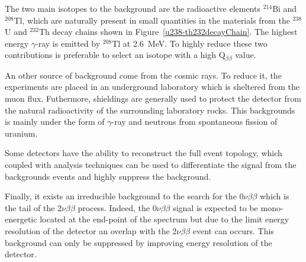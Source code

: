 \documentclass[main.tex]{subfiles}
\begin{document}
\bigskip


\NI The two main isotopes to the background are the radioactive elements $^{\text{214}}$Bi and $^{\text{208}}$Tl, which are naturally present in small quantities in the materials from the $^{\text{238}}$U and $^{\text{232}}$Th decay chains shown in Figure~\ref{u238-th232decayChain}. The highest energy $\gamma$-ray is emitted by $^{\text{208}}$Tl at 2.6~MeV. To highly reduce these two contributions is preferable to select an isotope with a high Q$_{\beta\beta}$ value.


\bigskip

\NI An other source of background come from the cosmic rays. To reduce it, the experiments are placed in an underground laboratory which is sheltered from the muon flux. Futhermore, shieldings are generally used to protect the detector from the natural radioactivity of the surrounding laboratory rocks. This backgrounds is mainly under the form of $\gamma$-ray and neutrons from spontaneous fission of uranium.


\bigskip


\NI Some detectors have the ability to reconstruct the full event topology,  which coupled with analysis techniques can be used to differentiate the signal from the backgrounds events and highly suppress the background.


\bigskip


\NI Finally, it exists an irreducible background to the search for the 0$\nu\beta\beta$ which is the tail of the  2$\nu\beta\beta$ process. Indeed, the 0$\nu\beta\beta$ signal is expected to be mono-energetic located at the end-point of the spectrum but due to the limit energy resolution of the detector an overlap with the 2$\nu\beta\beta$ event can occurs. This background can only be suppressed by improving energy resolution of the detector.  
\end{document}
